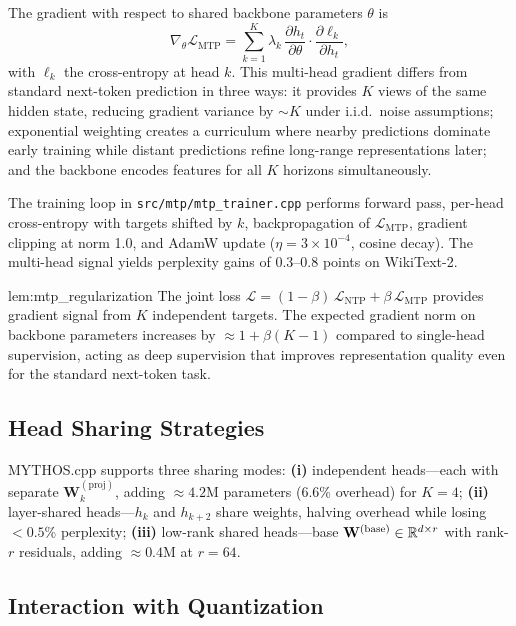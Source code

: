 The gradient with respect to shared backbone parameters $\theta$ is
\[
\nabla_\theta \mathcal{L}_{\text{MTP}} =
\sum_{k=1}^K \lambda_k \,
\frac{\partial h_t}{\partial\theta} \cdot
\frac{\partial \ell_k}{\partial h_t},
\]
with $\ell_k$ the cross-entropy at head $k$. This multi-head gradient
differs from standard next-token prediction in three ways: it provides
$K$ views of the same hidden state, reducing gradient variance by
$\sim K$ under i.i.d.\ noise assumptions; exponential weighting creates
a curriculum where nearby predictions dominate early training while
distant predictions refine long-range representations later; and the
backbone encodes features for all $K$ horizons simultaneously.

The training loop in \texttt{src/mtp/mtp\_trainer.cpp} performs forward
pass, per-head cross-entropy with targets shifted by $k$, backpropagation
of $\mathcal{L}_{\text{MTP}}$, gradient clipping at norm 1.0, and AdamW
update ($\eta = 3\times 10^{-4}$, cosine decay). The multi-head signal
yields perplexity gains of 0.3--0.8 points on WikiText-2.

\begin{mylemma}{lem:mtp_regularization}
The joint loss $\mathcal{L} = (1-\beta)\,\mathcal{L}_{\text{NTP}} +
\beta\,\mathcal{L}_{\text{MTP}}$ provides gradient signal from $K$
independent targets. The expected gradient norm on backbone parameters
increases by $\approx 1 + \beta(K-1)$ compared to single-head
supervision, acting as deep supervision that improves representation
quality even for the standard next-token task.
\end{mylemma}

\subsection{Head Sharing Strategies}

MYTHOS.cpp supports three sharing modes: \textbf{(i)} independent
heads---each with separate $\mathbf{W}_k^{(\text{proj})}$, adding
$\approx 4.2$M parameters (6.6\% overhead) for $K=4$; \textbf{(ii)}
layer-shared heads---$h_k$ and $h_{k+2}$ share weights, halving
overhead while losing $<0.5\%$ perplexity; \textbf{(iii)} low-rank
shared heads---base $\mathbf{W}^{(\text{base})} \in \mathbb{R}^{d \times r}$
with rank-$r$ residuals, adding $\approx 0.4$M at $r=64$.

\subsection{Interaction with Quantization}


